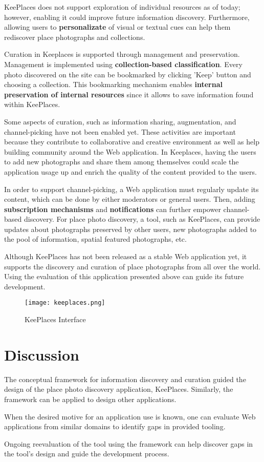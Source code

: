 {KeePlaces does not support exploration of individual resources as of today; however, enabling it could improve future information discovery. Furthermore, allowing users to \textbf{personalizate} of visual or textual cues can help them rediscover place photographs and collections. 

Curation in Keeplaces is supported through management and preservation. Management is implemented using \textbf{collection-based classification}.
Every photo discovered on the site can be bookmarked by clicking 'Keep' button and choosing a collection. This bookmarking mechanism enables \textbf{internal preservation of internal resources} since it allows to save information found within KeePlaces. 

Some aspects of curation, such as information sharing, augmentation, and channel-picking have not been enabled yet. These activities are important because they contribute to collaborative and creative environment as well as help building community around the Web application. In Keeplaces, having the users to add new photographs and share them among themselves could scale the application usage up and enrich the quality of the content provided to the users. 

In order to support channel-picking, a Web application must regularly update its content, which can be done by either moderators or general users. Then, adding \textbf{subscription mechanisms} and \textbf{notifications} can further empower channel-based discovery.  For place photo discovery, a tool, such as KeePlaces, can provide updates about photographs preserved by other users, new photographs added to the pool of information, spatial featured photographs, etc.

Although KeePlaces has not been released as a stable Web application yet, it supports the discovery and curation of place photographs from all over the world. Using the evaluation of this application presented above can guide its future development.

\begin{figure}[ht!]
	\noindent
	\centering
	\texttt{[image: keeplaces.png]}
	\caption{KeePlaces Interface}
	\label{fig:keeplaces} 
\end{figure}

} %

{\section{Discussion}
The conceptual framework for information discovery and curation guided the design of the place photo discovery application, KeePlaces. Similarly, the framework can be applied to design other applications. 

When the desired motive for an application use is known, one can evaluate Web applications from similar domains to identify gaps in provided tooling.  

Ongoing reevaluation of the tool using the framework can help discover gaps in the tool's design and guide the development process. 
} %





